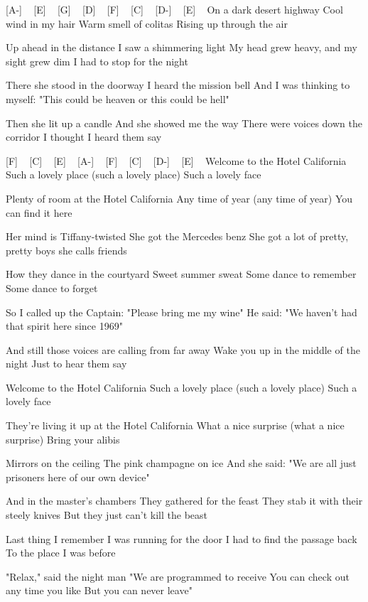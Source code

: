 

[A-] ~ [E] ~ [G] ~ [D] ~ [F] ~ [C] ~ [D-] ~ [E] ~
On a dark desert highway
Cool wind in my hair
Warm smell of colitas
Rising up through the air

Up ahead in the distance
I saw a shimmering light
My head grew heavy, and my sight grew dim
I had to stop for the night

There she stood in the doorway
I heard the mission bell
And I was thinking to myself:
"This could be heaven or this could be hell"

Then she lit up a candle
And she showed me the way
There were voices down the corridor
I thought I heard them say


[F] ~ [C] ~ [E] ~ [A-] ~ [F] ~ [C] ~ [D-] ~ [E] ~
Welcome to the Hotel California
Such a lovely place (such a lovely place)
Such a lovely face

Plenty of room at the Hotel California
Any time of year (any time of year)
You can find it here

Her mind is Tiffany-twisted
She got the Mercedes benz
She got a lot of pretty, pretty boys she calls friends

How they dance in the courtyard
Sweet summer sweat
Some dance to remember
Some dance to forget

So I called up the Captain:
"Please bring me my wine"
He said: "We haven't had that spirit here since 1969"

And still those voices are calling from far away
Wake you up in the middle of the night
Just to hear them say

Welcome to the Hotel California
Such a lovely place (such a lovely place)
Such a lovely face

They're living it up at the Hotel California
What a nice surprise (what a nice surprise)
Bring your alibis

Mirrors on the ceiling
The pink champagne on ice
And she said: "We are all just prisoners here of our own
device"

And in the master's chambers
They gathered for the feast
They stab it with their steely knives
But they just can't kill the beast

Last thing I remember
I was running for the door
I had to find the passage back
To the place I was before

"Relax," said the night man
"We are programmed to receive
You can check out any time you like
But you can never leave"